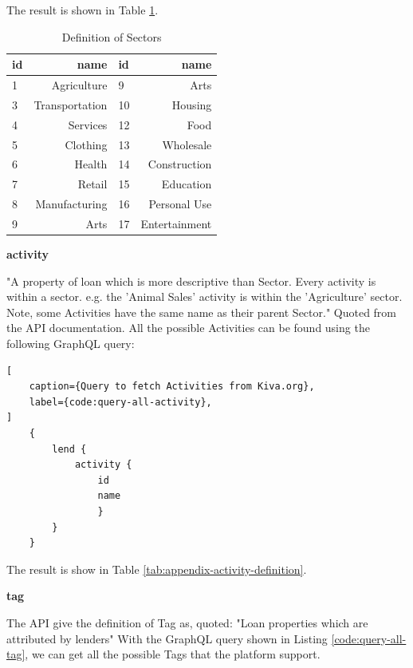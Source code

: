 The result is shown in Table \ref{tab:sector-definition}.

\begin{table}[H]
	\centering
	\caption{Definition of Sectors}
	\label{tab:sector-definition}
	\begin{tabular}{|l|r|l|r|}
		\hline
		id & name           & id & name          \\
		\hline
		1  & Agriculture    & 9  & Arts          \\
		3  & Transportation & 10 & Housing       \\
		4  & Services       & 12 & Food          \\
		5  & Clothing       & 13 & Wholesale     \\
		6  & Health         & 14 & Construction  \\
		7  & Retail         & 15 & Education     \\
		8  & Manufacturing  & 16 & Personal Use  \\
		9  & Arts           & 17 & Entertainment \\
		\hline
	\end{tabular}
\end{table}


\textbf{\Gls{activity}}

"A property of loan which is more descriptive than Sector.
Every activity is within a sector. e.g. the 'Animal Sales' activity is within the 'Agriculture' sector.
Note, some Activities have the same name as their parent Sector."
Quoted from the API documentation.
All the possible Activities can be found using the following GraphQL query:

\begin{minipage}[c]{0.95\textwidth}
	\begin{lstlisting}[
	caption={Query to fetch Activities from Kiva.org},
	label={code:query-all-activity},
]
    {
        lend {
            activity {
                id
                name
                }	
        }
    }
\end{lstlisting}
\end{minipage}

The result is show in Table \ref{tab:appendix-activity-definition}.

\textbf{\Gls{tag}}

The API give the definition of Tag as,
quoted: "Loan properties which are attributed by lenders"
With the GraphQL query shown in Listing \ref{code:query-all-tag}, we can get all the possible Tags that the platform support.

